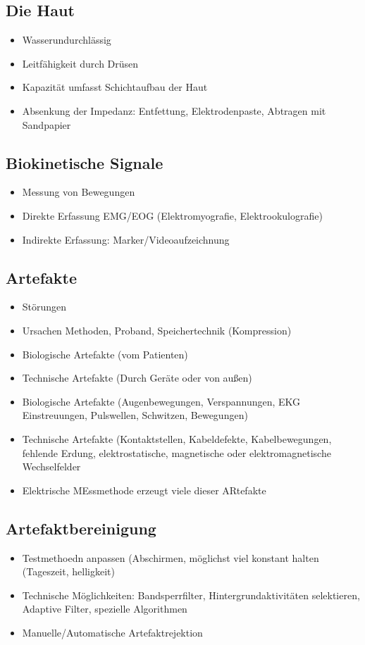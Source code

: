 \documentclass[a4paper,10pt,oneside]{article}
\begin{document}
\subsection{Die Haut}
\begin{itemize}
	\item Wasserundurchlässig
	\item Leitfähigkeit durch Drüsen
	\item Kapazität umfasst Schichtaufbau der Haut
	\item Absenkung der Impedanz: Entfettung, Elektrodenpaste, Abtragen mit Sandpapier 
\end{itemize}

\subsection{Biokinetische Signale}
\begin{itemize}
	\item Messung von Bewegungen
	\item Direkte Erfassung EMG/EOG (Elektromyografie, Elektrookulografie)
	\item Indirekte Erfassung: Marker/Videoaufzeichnung
\end{itemize}


\subsection{Artefakte}
\begin{itemize}
	\item Störungen
	\item Ursachen Methoden, Proband, Speichertechnik (Kompression)
	\item Biologische Artefakte (vom Patienten)
	\item Technische Artefakte (Durch Geräte oder von außen)
	\item Biologische Artefakte (Augenbewegungen, Verspannungen, EKG Einstreuungen, Pulswellen, Schwitzen, Bewegungen)
	\item Technische Artefakte (Kontaktstellen, Kabeldefekte, Kabelbewegungen, fehlende Erdung, elektrostatische, magnetische oder elektromagnetische Wechselfelder
	\item Elektrische MEssmethode erzeugt viele dieser ARtefakte
\end{itemize}

\subsection{Artefaktbereinigung}
\begin{itemize}
	\item Testmethoedn anpassen (Abschirmen, möglichst viel konstant halten (Tageszeit, helligkeit)
	\item Technische Möglichkeiten: Bandsperrfilter, Hintergrundaktivitäten selektieren, Adaptive Filter, spezielle Algorithmen
	\item Manuelle/Automatische Artefaktrejektion
\end{itemize}
\end{document}
